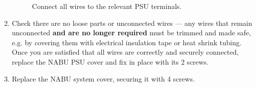 \documentclass[twocolumn]{report}
\begin{document}
\begin{enumerate}
\begin{figure}[h!]
   		\caption{Connect all wires to the relevant PSU terminals.}
   		\label{fig:terminals}
   	\end{figure}
	\item Check there are no loose parts or unconnected wires --- any wires that remain unconnected \textbf{and are no longer required} must be trimmed and made safe, e.g. by covering them with electrical insulation tape or heat shrink tubing. Once you are satisfied that all wires are correctly and securely connected, replace the NABU PSU cover and fix in place with its 2 screws.
	\item Replace the NABU system cover, securing it with 4 screws.
\end{enumerate}
\end{document}
